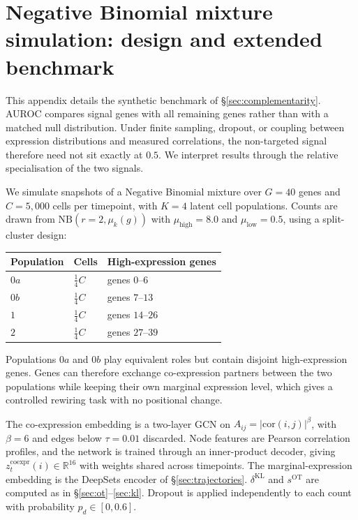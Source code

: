 \documentclass[10pt, letterpaper]{article}
\newcommand{\zco}{z^{\mathrm{coexpr}}}
\newcommand{\dKL}{\delta^{\mathrm{KL}}}
\begin{document}



\newpage
\appendix
\section{Negative Binomial mixture simulation: design and extended benchmark}
\label{app:nb}

This appendix details the synthetic benchmark of \S\ref{sec:complementarity}. AUROC compares signal genes with all remaining genes rather than with a matched null distribution. Under finite sampling, dropout, or coupling between expression distributions and measured correlations, the non-targeted signal therefore need not sit exactly at $0.5$. We interpret results through the relative specialisation of the two signals.

We simulate snapshots of a Negative Binomial mixture over $G=40$ genes and $C=5{,}000$ cells per timepoint, with $K=4$ latent cell populations. Counts are drawn from $\mathrm{NB}(r=2,\mu_k(g))$ with $\mu_{\mathrm{high}}=8.0$ and $\mu_{\mathrm{low}}=0.5$, using a split-cluster design:

\begin{center}
\begin{tabular}{lll}
\toprule
Population & Cells & High-expression genes \\
\midrule
$0a$ & $\tfrac{1}{4}C$ & genes $0$--$6$ \\
$0b$ & $\tfrac{1}{4}C$ & genes $7$--$13$ \\
$1$  & $\tfrac{1}{4}C$ & genes $14$--$26$ \\
$2$  & $\tfrac{1}{4}C$ & genes $27$--$39$ \\
\bottomrule
\end{tabular}
\end{center}

Populations $0a$ and $0b$ play equivalent roles but contain disjoint high-expression genes. Genes can therefore exchange co-expression partners between the two populations while keeping their own marginal expression level, which gives a controlled rewiring task with no positional change.

The co-expression embedding is a two-layer GCN on $A_{ij}=|\mathrm{cor}(i,j)|^\beta$, with $\beta=6$ and edges below $\tau=0.01$ discarded. Node features are Pearson correlation profiles, and the network is trained through an inner-product decoder, giving $\zco_t(i)\in\mathbb{R}^{16}$ with weights shared across timepoints. The marginal-expression embedding is the DeepSets encoder of \S\ref{sec:trajectories}. $\dKL$ and $s^{\mathrm{OT}}$ are computed as in \S\ref{sec:ot}--\ref{sec:kl}. Dropout is applied independently to each count with probability $p_d\in[0,0.6]$.
\end{document}

